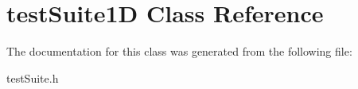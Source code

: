 \hypertarget{classtest_suite1_d}{}\section{test\+Suite1D Class Reference}
\label{classtest_suite1_d}


The documentation for this class was generated from the following file\+:\begin{DoxyCompactItemize}
\item 
test\+Suite.\+h\end{DoxyCompactItemize}

